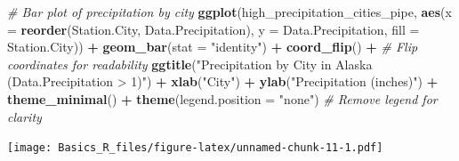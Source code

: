 \documentclass[
]{article}
\newenvironment{Shaded}{\begin{snugshade}}{\end{snugshade}}
\newcommand{\CommentTok}[1]{\textcolor[rgb]{0.56,0.35,0.01}{\textit{#1}}}
\newcommand{\DataTypeTok}[1]{\textcolor[rgb]{0.13,0.29,0.53}{#1}}
\newcommand{\KeywordTok}[1]{\textcolor[rgb]{0.13,0.29,0.53}{\textbf{#1}}}
\newcommand{\NormalTok}[1]{#1}
\newcommand{\OperatorTok}[1]{\textcolor[rgb]{0.81,0.36,0.00}{\textbf{#1}}}
\newcommand{\StringTok}[1]{\textcolor[rgb]{0.31,0.60,0.02}{#1}}
\begin{document}
\begin{Shaded}
\begin{Highlighting}[]
\CommentTok{# Bar plot of precipitation by city}
\KeywordTok{ggplot}\NormalTok{(high_precipitation_cities_pipe, }\KeywordTok{aes}\NormalTok{(}\DataTypeTok{x =} \KeywordTok{reorder}\NormalTok{(Station.City, Data.Precipitation), }\DataTypeTok{y =}\NormalTok{ Data.Precipitation, }\DataTypeTok{fill =}\NormalTok{ Station.City)) }\OperatorTok{+}
\StringTok{  }\KeywordTok{geom_bar}\NormalTok{(}\DataTypeTok{stat =} \StringTok{"identity"}\NormalTok{) }\OperatorTok{+}
\StringTok{  }\KeywordTok{coord_flip}\NormalTok{() }\OperatorTok{+}\StringTok{  }\CommentTok{# Flip coordinates for readability}
\StringTok{  }\KeywordTok{ggtitle}\NormalTok{(}\StringTok{"Precipitation by City in Alaska (Data.Precipitation > 1)"}\NormalTok{) }\OperatorTok{+}
\StringTok{  }\KeywordTok{xlab}\NormalTok{(}\StringTok{"City"}\NormalTok{) }\OperatorTok{+}
\StringTok{  }\KeywordTok{ylab}\NormalTok{(}\StringTok{"Precipitation (inches)"}\NormalTok{) }\OperatorTok{+}
\StringTok{  }\KeywordTok{theme_minimal}\NormalTok{() }\OperatorTok{+}
\StringTok{  }\KeywordTok{theme}\NormalTok{(}\DataTypeTok{legend.position =} \StringTok{"none"}\NormalTok{)  }\CommentTok{# Remove legend for clarity}
\end{Highlighting}
\end{Shaded}

\texttt{[image: Basics\_R\_files/figure-latex/unnamed-chunk-11-1.pdf]}
\end{document}
